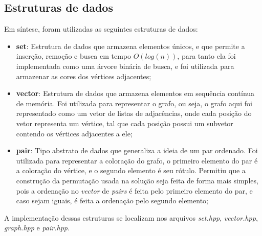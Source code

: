 \documentclass{article}
\begin{document}
\subsection{Estruturas de dados}

Em síntese, foram utilizadas as seguintes estruturas de dados:

\begin{itemize}
    \item \textbf{set}: Estrutura de dados que armazena elementos únicos, e que permite a inserção, remoção e busca em tempo $O(log(n))$, 
    para tanto ela foi implementada como uma árvore binária de busca, e foi utilizada para armazenar as cores dos vértices adjacentes;    

    \item \textbf{vector}: Estrutura de dados que armazena elementos em sequência contínua de memória. Foi utilizada para representar o grafo, 
    ou seja, o grafo aqui foi representado como um vetor de listas de adjacências, onde cada posição do vetor representa um vértice, tal que cada 
    posição possui um subvetor contendo os vértices adjacentes a ele;

    \item \textbf{pair}: Tipo abstrato de dados que generaliza a ideia de um par ordenado. Foi utilizada para representar a coloração do grafo, 
    o primeiro elemento do par é a coloração do vértice, e o segundo elemento é seu rótulo. Permitiu que a construção da permutação usada na solução seja 
    feita de forma mais simples, pois a ordenação no \emph{vector} de \emph{pairs} é feita pelo primeiro elemento do par, e caso sejam iguais, é feita a ordenação pelo segundo elemento;

\end{itemize}

A implementação dessas estruturas se localizam nos arquivos \emph{set.hpp}, \emph{vector.hpp}, \emph{graph.hpp} e \emph{pair.hpp}.
\end{document}
